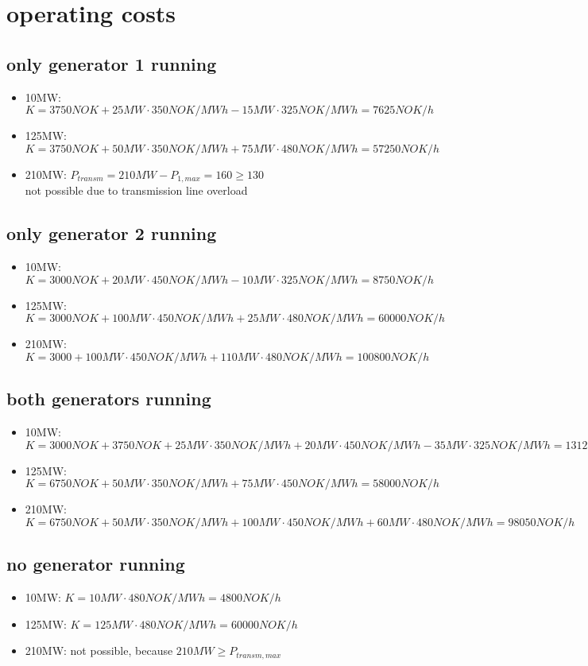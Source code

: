 \documentclass{article}
\begin{document}
	\section{operating costs}
		\subsection{only generator 1 running}
			\begin{itemize}
				\item 10MW: $K=3750NOK+25MW\cdot 350NOK/MWh-15MW\cdot 325NOK/MWh=7625NOK/h$
				\item 125MW: $K=3750NOK+50MW\cdot 350NOK/MWh+75MW\cdot 480NOK/MWh=57250NOK/h$
				\item 210MW: $P_{transm}=210MW-P_{1,max}=160\geq 130$\\
					not possible due to transmission line overload
			\end{itemize}

		\subsection{only generator 2 running}
			\begin{itemize}
				\item 10MW:	$K=3000NOK+20MW\cdot 450NOK/MWh-10MW\cdot 325NOK/MWh=8750NOK/h$
				\item 125MW:$K=3000NOK+100MW\cdot 450NOK/MWh+25MW\cdot 480NOK/MWh=60000NOK/h$
				\item 210MW: $K=3000+100MW\cdot 450NOK/MWh+110MW\cdot 480NOK/MWh=100800NOK/h$
			\end{itemize}

		\subsection{both generators running}
			\begin{itemize}
				\item 10MW: $K=3000NOK+3750NOK+25MW\cdot 350NOK/MWh+20MW\cdot 450NOK/MWh-35MW\cdot 325NOK/MWh=13125NOK/h$
				\item 125MW: $K=6750NOK+50MW\cdot 350NOK/MWh+75MW\cdot 450NOK/MWh=58000NOK/h$
				\item 210MW: $K=6750NOK+50MW\cdot 350NOK/MWh+100MW\cdot 450NOK/MWh+60MW\cdot 480NOK/MWh=98050NOK/h$
			\end{itemize}

		\subsection{no generator running}
			\begin{itemize}
				\item 10MW: $K=10MW\cdot 480NOK/MWh=4800NOK/h$
				\item 125MW: $K=125MW\cdot 480NOK/MWh=60000NOK/h$
				\item 210MW: not possible, because $210MW\geq P_{transm,max}$
			\end{itemize}
\end{document}
